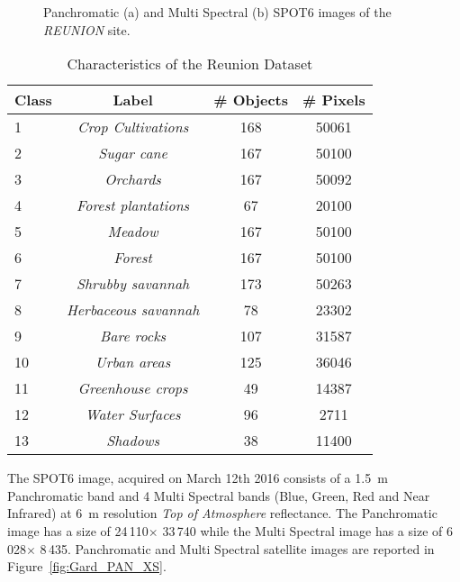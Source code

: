 \documentclass[journal]{IEEEtran}
\begin{document}
\begin{figure}[!ht]
\centering
{}
\caption{ Panchromatic (a) and Multi Spectral (b) SPOT6 images of the \textit{REUNION} site. \label{fig:Reunion_PAN_XS} }
\end{figure}\begin{table}[!ht]
\centering
\begin{tabular}{|l||c|c|c|}
	\hline
\textbf{Class} & Label & \# \textbf{Objects} & \# \textbf{Pixels} \\
\hline \hline
1 & {\em Crop Cultivations} & 168 & 50061 \\ \hline
2 & {\em Sugar cane} & 167 & 50100  \\ \hline
3 & {\em Orchards} & 167 & 50092 \\ \hline
4 & {\em Forest plantations} & 67 & 20100 \\ \hline
5 & {\em Meadow} & 167 & 50100 \\ \hline
6 & {\em Forest} & 167 & 50100 \\ \hline
7 & {\em Shrubby savannah} & 173 & 50263 \\ \hline
8 & {\em Herbaceous savannah} & 78 & 23302 \\ \hline
9 & {\em Bare rocks} & 107 & 31587 \\ \hline
10 & {\em Urban areas} & 125 & 36046 \\ \hline
11 & {\em Greenhouse crops}& 49 & 14387 \\ \hline
12 & {\em Water Surfaces} & 96 &  2711\\ \hline
13 & {\em Shadows} & 38 & 11400 \\ \hline
\end{tabular}
\caption{Characteristics of the Reunion Dataset\label{tab:data_reu}}
\end{table}%

The SPOT6 image, acquired on March 12th 2016 consists of a 1.5~m Panchromatic band and 4 Multi Spectral bands (Blue, Green, Red and Near Infrared) at 6~m resolution \textit{Top of Atmosphere} reflectance.
The Panchromatic image has a size of 24\,110$\times$ 33\,740 while the Multi Spectral image has a size of
6\,028$\times$ 8\,435. Panchromatic and Multi Spectral satellite images are reported in Figure~\ref{fig:Gard_PAN_XS}.
\end{document}
